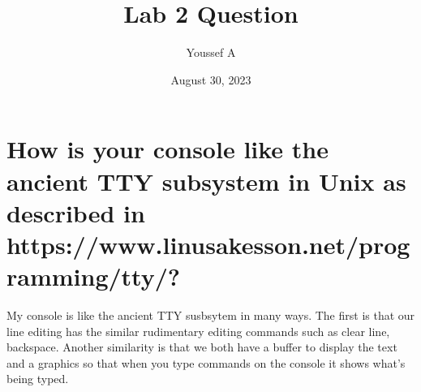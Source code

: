 \documentclass{article}
\title{Lab 2 Question}
\author{Youssef A}
\date{August 30, 2023}
\begin{document}
\maketitle

\section{How is your console like the ancient TTY subsystem in Unix as described in 
https://www.linusakesson.net/programming/tty/?}

My console is like the ancient TTY susbsytem in many ways. The first is that our line editing has the similar rudimentary editing commands such as clear line, backspace. Another similarity is that we both have a buffer to display the text and a graphics so that when you type commands on the console it shows what's being typed.  
\end{document}
